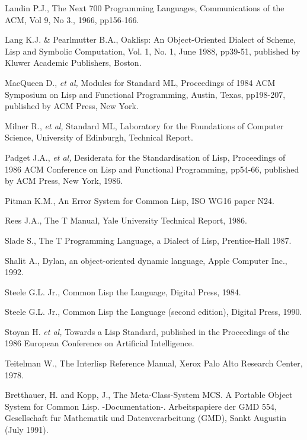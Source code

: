 \begin{optDefinition}
\begin{references}
    {Landin P.J.,}
    {The Next 700 Programming Languages,}
    {Communications of the ACM, Vol 9, No 3., 1966, pp156-166.}
    \label{iswim}

    {Lang K.J. \& Pearlmutter B.A.,}
    {Oaklisp: An Object-Oriented Dialect of Scheme,}
    {Lisp and Symbolic Computation, Vol. 1, No. 1, June 1988, pp39-51,
     published by Kluwer Academic Publishers, Boston.}
    \label{oaklisp}

    {MacQueen D., {\em et al,}}
    {Modules for Standard ML,}
    {Proceedings of 1984 ACM Symposium on Lisp and Functional Programming,
     Austin, Texas, pp198-207, published by ACM Press, New York.}
    \label{ML-modules}

    {Milner R., {\em et al,}}
    {Standard ML,}
    {Laboratory for the Foundations of Computer Science,
     University of Edinburgh, Technical Report.}
    \label{std-ml}

    {Padget J.A., {\em et al,}}
    {Desiderata for the Standardisation of Lisp,}
    {Proceedings of 1986 ACM Conference on Lisp and Functional Programming,
     pp54-66, published by ACM Press, New York, 1986.}
    \label{desiderata}

    {Pitman K.M.,}
    {An Error System for Common Lisp,}
    {ISO WG16 paper N24.}
    \label{Pit-errors}

    {Rees J.A.,}
    {The T Manual,}
    {Yale University Technical Report, 1986.}
    \label{t-manual}

    {Slade S.,}
    {The T Programming Language, a Dialect of Lisp,}
    {Prentice-Hall 1987.}
    \label{t-book}

    {Shalit A.,}
    {Dylan, an object-oriented dynamic language,}
    {Apple Computer Inc., 1992.}
    \label{dylan}

    {Steele G.L. Jr.,}
    {Common Lisp the Language,}
    {Digital Press, 1984.}
    \label{CLtl}

    {Steele G.L. Jr.,}
    {Common Lisp the Language (second edition),}
    {Digital Press, 1990.}
    \label{CLtlt}

    {Stoyan H. {\em et al,}}
    {Towards a Lisp Standard,}
    {published in the Proceedings of the 1986 European Conference on Artificial
     Intelligence.}
    \label{stoyan}

    {Teitelman W.,}
    {The Interlisp Reference Manual,}
    {Xerox Palo Alto Research Center, 1978.}
    \label{interlisp}

    {Bretthauer, H. and Kopp, J.,}
    {The Meta-Class-System MCS. A Portable Object System for Common Lisp.
     -Documentation-.}
    {Arbeitspapiere der GMD 554, Gesellschaft fur Mathematik und
     Datenverarbeitung (GMD), Sankt Augustin (July 1991).}
    \label{mcs}

\end{references}
\end{optDefinition}

